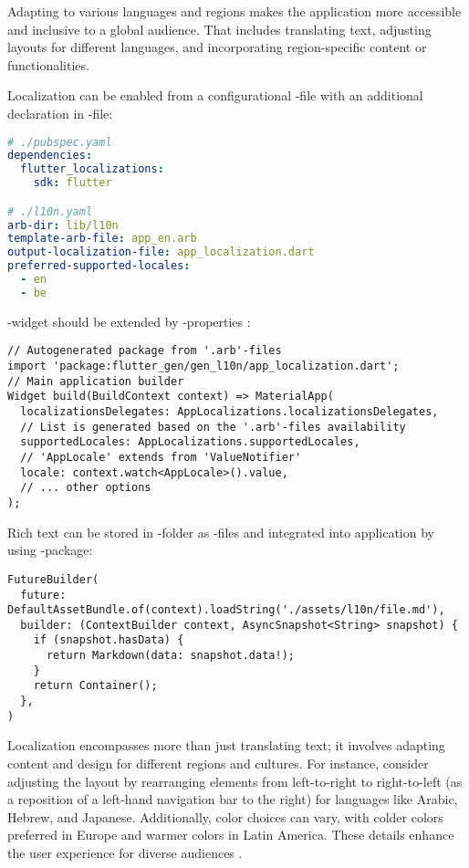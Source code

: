 Adapting to various languages and regions makes the application more accessible and inclusive to a global audience. 
That includes translating text, adjusting layouts for different languages, and incorporating region-specific content 
or functionalities.

Localization can be enabled from a configurational -file with an additional declaration in 
-file: 

\begin{lstlisting}[language=yaml]
# ./pubspec.yaml
dependencies:
  flutter_localizations:
    sdk: flutter

# ./l10n.yaml
arb-dir: lib/l10n
template-arb-file: app_en.arb
output-localization-file: app_localization.dart
preferred-supported-locales:
  - en
  - be
\end{lstlisting}

\noindent {}-widget should be extended by -properties :

\begin{lstlisting}
// Autogenerated package from '.arb'-files
import 'package:flutter_gen/gen_l10n/app_localization.dart';
// Main application builder
Widget build(BuildContext context) => MaterialApp(
  localizationsDelegates: AppLocalizations.localizationsDelegates,
  // List is generated based on the '.arb'-files availability
  supportedLocales: AppLocalizations.supportedLocales,
  // 'AppLocale' extends from 'ValueNotifier'
  locale: context.watch<AppLocale>().value,
  // ... other options
);
\end{lstlisting}

\noindent Rich text can be stored in -folder as -files and integrated into application by using 
-package:

\begin{lstlisting}
FutureBuilder(
  future: DefaultAssetBundle.of(context).loadString('./assets/l10n/file.md'),
  builder: (ContextBuilder context, AsyncSnapshot<String> snapshot) {
    if (snapshot.hasData) {
      return Markdown(data: snapshot.data!);
    }
    return Container();
  },
)
\end{lstlisting}

\noindent Localization encompasses more than just translating text; it involves adapting content and design for 
different regions and cultures. For instance, consider adjusting the layout by rearranging elements from left-to-right
to right-to-left (as a reposition of a left-hand navigation bar to the right) for languages like Arabic, Hebrew, and 
Japanese. Additionally, color choices can vary, with colder colors preferred in Europe and warmer colors in Latin 
America. These details enhance the user experience for diverse audiences \cite{Rein14}.


